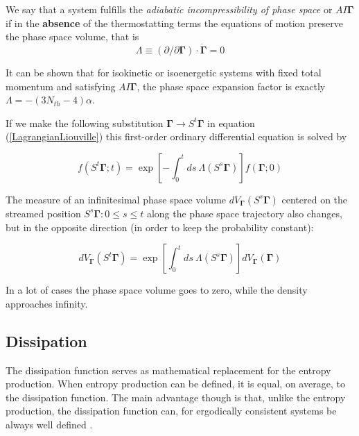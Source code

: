 \documentclass[a4paper,12pt]{article}
\begin{document}
We say that a system fulfills the \textit{adiabatic incompressibility of phase space} or $AI\bm{\Gamma}$ if in the \textbf{absence} of the thermostatting terms the equations of motion preserve the phase space volume, that is
\begin{equation}
  \Lambda \equiv (\partial / \partial\bm{\Gamma}) \cdot \dot{\bm{\Gamma}}=0
\end{equation}


It can be shown\cite{Evans:2016tq} that for isokinetic or isoenergetic systems with fixed total momentum and satisfying $AI\bm{\Gamma}$, the phase space expansion factor is exactly $\Lambda = - (3N_{th} -4) \alpha $.
\noindent\makebox[\linewidth]{\rule{\textwidth}{1pt}} 

If we make the following substitution $\bm{\Gamma} \to S^t\bm{\Gamma}$ in equation (\ref{LagrangianLiouville}) this first-order ordinary differential equation is solved by

\begin{equation}
\label{distributionStreaming}
  f(S^t\bm{\Gamma};t)=\exp[-\int_0^t ds\ \Lambda(S^s\bm{\Gamma})]f(\bm{\Gamma};0)
\end{equation}

The measure of an infinitesimal phase space volume $dV_{\bm{\Gamma}}(S^s \bm{\Gamma})$ centered on the streamed position $S^s\bm{\Gamma} : 0 \leq s \leq t $ along the phase space trajectory also changes, but in the opposite direction (in order to keep the probability constant):

\begin{equation}
\label{PhaseVolumeExpansion}
  dV_{\bm{\Gamma}}(S^t \bm{\Gamma}) =\exp[\int_0^t ds\ \Lambda(S^s\bm{\Gamma})]dV_{\bm{\Gamma}}(\bm{\Gamma})
\end{equation}
 
In a lot of cases the phase space volume goes to zero, while the density approaches infinity\cite{Evans:2016tq}.


\subsection{Dissipation}

The dissipation function serves as mathematical replacement for the entropy production. When entropy production can be defined, it is equal, on average, to the dissipation function. The main advantage though is that, unlike the entropy production, the dissipation function can, for ergodically consistent systems be always well defined \cite{Evans:2016tq}.
\end{document}
